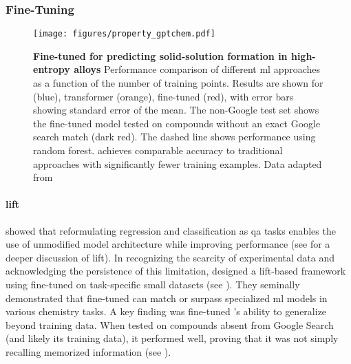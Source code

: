 \subsubsection{Fine-Tuning}\label{sec:prediction_FT}
\begin{figure}[htb] 
    \centering
    \texttt{[image: figures/property\_gptchem.pdf]}
    \caption{\textbf{Fine-tuned  for predicting solid-solution formation in high-entropy alloys} Performance comparison of different \gls{ml} approaches as a function of the number of training points. Results are shown for  (blue),  transformer (orange),  fine-tuned  (red), with error bars showing standard error of the mean. The non-Google test set shows the fine-tuned  model tested on compounds without an exact Google search match (dark red). The dashed line shows performance using random forest.  achieves comparable accuracy to traditional approaches with significantly fewer training examples. Data adapted from \textcite{jablonka2024leveraging}}
    \label{fig:gptchem}
\end{figure}

\paragraph{\gls{lift}} \textcite{dinh2022lift} showed that reformulating regression and classification as \gls{qa} tasks enables the use of unmodified model architecture while improving performance (see  for a deeper discussion of \gls{lift}). 
In recognizing the scarcity of experimental data and acknowledging the persistence of this limitation, \textcite{jablonka2024leveraging} designed a \gls{lift}-based framework using  fine-tuned on task-specific small datasets (see ). 
They seminally demonstrated that fine-tuned  can match or surpass specialized \gls{ml} models in various chemistry tasks. A key finding was fine-tuned 's ability to generalize beyond training data. 
When tested on compounds absent from Google Search (and likely its training data), it performed well, proving that it was not simply recalling memorized information (see ).

